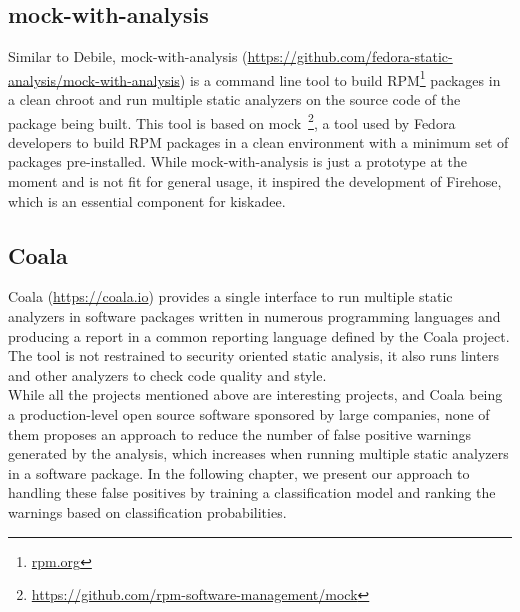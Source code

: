 \subsection{mock-with-analysis}

Similar to Debile, mock-with-analysis
(\url{https://github.com/fedora-static-analysis/mock-with-analysis}) is a
command line tool to build RPM\footnote{\url{rpm.org}} packages in a clean
chroot and run multiple static analyzers on the source code of the package
being built. This tool is based on
mock~\footnote{\url{https://github.com/rpm-software-management/mock}}, a tool
used by Fedora developers to build RPM packages in a clean environment with a
minimum set of packages pre-installed. While mock-with-analysis is just a
prototype at the moment and is not fit for general usage, it inspired the
development of Firehose, which is an essential component for kiskadee.

\subsection{Coala}

Coala (\url{https://coala.io}) provides a single interface to run multiple
static analyzers in software packages written in numerous programming languages
and producing a report in a common reporting language defined by the Coala
project. The tool is not restrained to security oriented static analysis, it
also runs linters and other analyzers to check code quality and style. \\

While all the projects mentioned above are interesting projects, and Coala
being a production-level open source software sponsored by large companies,
none of them proposes an approach to reduce the number of false positive
warnings generated by the analysis, which increases when running multiple
static analyzers in a software package. In the following chapter, we present
our approach to handling these false positives by training a classification model
and ranking the warnings based on classification probabilities.

